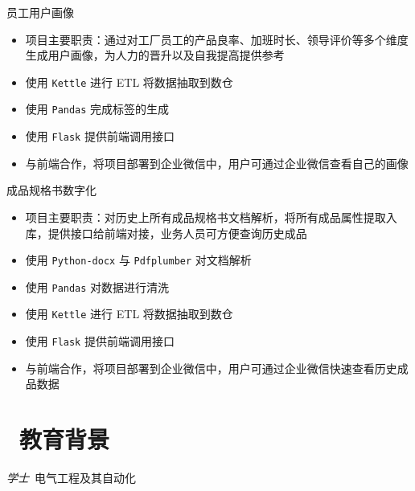 \documentclass{resume}
\begin{document}
\begin{onehalfspacing}
员工用户画像
\begin{itemize}
\item 项目主要职责：通过对工厂员工的产品良率、加班时长、领导评价等多个维度生成用户画像，为人力的晋升以及自我提高提供参考
\item 使用 \texttt{Kettle} 进行 ETL 将数据抽取到数仓
\item 使用 \texttt{Pandas} 完成标签的生成
\item 使用 \texttt{Flask} 提供前端调用接口
\item 与前端合作，将项目部署到企业微信中，用户可通过企业微信查看自己的画像
\end{itemize}
\end{onehalfspacing}

\begin{onehalfspacing}
成品规格书数字化
\begin{itemize}
\item 项目主要职责：对历史上所有成品规格书文档解析，将所有成品属性提取入库，提供接口给前端对接，业务人员可方便查询历史成品
\item 使用 \texttt{Python-docx} 与 \texttt{Pdfplumber} 对文档解析
\item 使用 \texttt{Pandas} 对数据进行清洗
\item 使用 \texttt{Kettle} 进行 ETL 将数据抽取到数仓
\item 使用 \texttt{Flask} 提供前端调用接口
\item 与前端合作，将项目部署到企业微信中，用户可通过企业微信快速查看历史成品数据
\end{itemize}
\end{onehalfspacing}



\section{\faGraduationCap\  教育背景}
\textit{学士}\ 电气工程及其自动化
\end{document}
